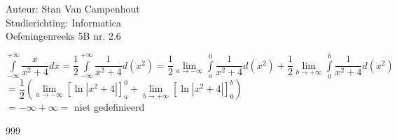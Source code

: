 \documentclass[a4paper]{article}
\begin{document}
  
\noindent \large Auteur: Stan Van Campenhout \\
\noindent \large Studierichting:  Informatica\\
\noindent \large Oefeningenreeks 5B nr. 2.6\\

\medskip

\normalsize

$ \displaystyle\int\limits_{-\infty}^{+\infty}\dfrac{x}{x^2+4} dx = \dfrac{1}{2}\displaystyle\int\limits_{-\infty}^{+\infty}\dfrac{1}{x^2+4} d\left(x^2\right) 
= \dfrac{1}{2}\lim\limits_{a\rightarrow-\infty}\displaystyle\int\limits_{a}^{0}\dfrac{1}{x^2+4} d\left(x^2\right) 
+ \dfrac{1}{2}\lim\limits_{b\rightarrow+\infty}\displaystyle\int\limits_{0}^{b}\dfrac{1}{x^2+4} d\left(x^2\right)$\\

$ =\dfrac{1}{2}\left(\lim\limits_{a\rightarrow-\infty}\left[\ln\left|x^2+4\right|\right]_a^0+\lim\limits_{b\rightarrow+\infty}\left[\ln\left|x^2+4\right|\right]_0^b\right) $\\

$ = -\infty + \infty = $ niet gedefinieerd \\


\begin{thebibliography}{999}
\end{thebibliography}
\end{document}
